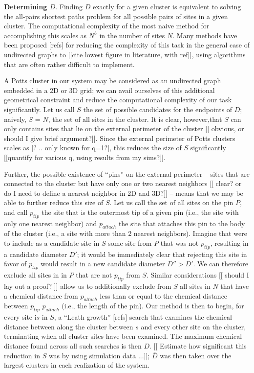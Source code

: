 \documentclass[aps, preprint, groupedaddress]{revtex4}
\begin{document}
{\bf Determining $D$}.  Finding $D$ exactly for a given cluster is equivalent to solving the all-pairs shortest paths problem for all possible pairs of sites in a given cluster.  The computational complexity of the most naive method for accomplishing this scales as $N^3$ in the number of sites $N$.  Many methods have been proposed [refs] for reducing the complexity of this task in the general case of undirected graphs to [[cite lowest figure in literature, with ref]], using algorithms that are often rather difficult to implement. 

A Potts cluster in our system may be considered as an undirected graph embedded in a 2D or 3D grid; we can avail ourselves of this additional geometrical constraint and reduce the computational complexity of our task significantly. Let us call $S$ the set of possible candidates for the endpoints of $D$; naively, $S$ = $N$, the set of all sites in the cluster. It is clear, however,that $S$ can only contains sites that lie on the external perimeter of the cluster [[ obvious, or should I give brief argument?]]. Since the external perimeter of Potts clusters scales as [? .. only known for q=1?], this reduces the size of $S$ significantly [[quantify for various q, using results from my sims?]].  

Further, the possible existence of ``pins'' on the external perimeter -- sites that are connected to the cluster but have only one or two nearest neighbors [[ clear? or do I need to define a nearest neighbor in 2D and 3D?]] -- means that we may be able to further reduce this size of $S$.  Let us call the set of all sites on the pin $P$, and call $p_{tip}$ the site that is the outermost tip of a given pin (i.e., the site with only one nearest neighbor) and $p_{attach}$ the site that attaches this pin to the body of the cluster (i.e., a site with more than 2 nearest neighbors).  Imagine that were to include as a candidate site in $S$ some site from $P$ that was not $p_{tip}$, resulting in a candidate diameter $D'$; it would be immediately clear that rejecting this site in favor of $p_{tip}$ would result in a new candidate diameter $D''>D'$.  We can therefore exclude all sites in in $P$ that are not $p_{tip}$ from $S$.  Similar considerations [[ should I lay out a proof? ]] allow us to additionally exclude from $S$ all sites in $N$ that have a chemical distance from $p_{attach}$ less than or equal to the chemical distance between $p_{tip}$ $p_{attach}$ (i.e., the length of the pin). Our method is then to begin, for every site i$s$ in $S$, a ``Leath growth'' [refs] search that examines the chemical distance between along the cluster between $s$ and every other site on the cluster, terminating when all cluster sites have been examined.  The maximum chemical distance found across all such searches is then $D$.   [[ Estimate how significant this reduction in $S$ was by using simulation data ...]]; $\bar{D}$ was then taken over the largest clusters in each realization of the system.
\end{document}
